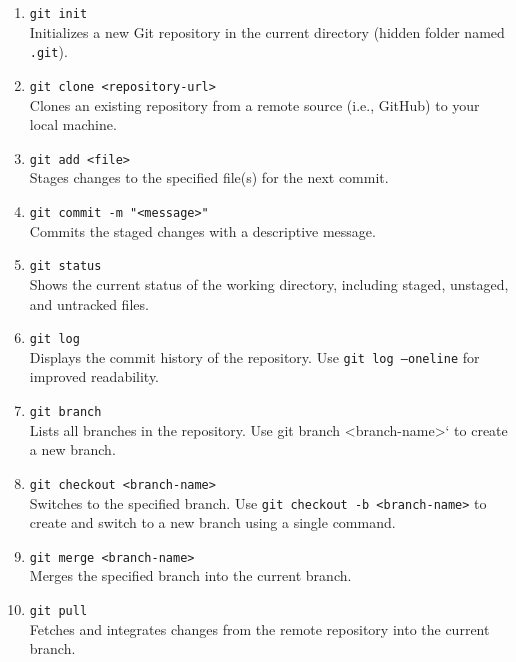 \documentclass[12pt]{article}
\begin{document}
\begin{enumerate}

  \item \texttt{git init} \\
    Initializes a new Git repository in the current directory (hidden folder
    named \texttt{.git}).

  \item \texttt{git clone <repository-url>} \\
    Clones an existing repository from a remote source (i.e., GitHub) to
    your local machine.

  \item \texttt{git add <file>} \\
    Stages changes to the specified file(s) for the next commit.

  \item \texttt{git commit -m "<message>"} \\
    Commits the staged changes with a descriptive message.

  \item \texttt{git status} \\
    Shows the current status of the working directory, including staged,
    unstaged, and untracked files.

  \item \texttt{git log} \\
    Displays the commit history of the repository. Use
    \texttt{git log --oneline} for improved readability.

  \item \texttt{git branch} \\
    Lists all branches in the repository. Use git branch <branch-name>` to
    create a new branch.

  \item \texttt{git checkout <branch-name>} \\
    Switches to the specified branch. Use
    \texttt{git checkout -b <branch-name>} to create and switch to a new
    branch using a single command.

  \item \texttt{git merge <branch-name>} \\
    Merges the specified branch into the current branch.

  \item \texttt{git pull} \\
    Fetches and integrates changes from the remote repository into the
    current branch.


\end{enumerate}
\end{document}
